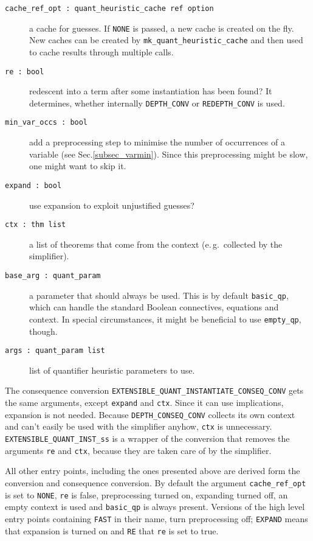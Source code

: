 \documentclass[a4paper,12pt,DIV=12,oneside]{scrbook}
\theoremstyle{definition}
\theoremstyle{remark}
\begin{document}
\begin{description}
  \item[\texttt{cache\_ref\_opt\ :\ quant\_heuristic\_cache ref option}]
     a cache for guesses. If \texttt{NONE} is passed,
     a new cache is created on the fly. New caches can be created by \texttt{mk\_quant\_heuristic\_cache} and then
     used to cache results through multiple calls.
  \item[\texttt{re\ :\ bool}]  redescent into a term after some instantiation has been found?
     It determines, whether internally \texttt{DEPTH\_CONV} or \texttt{REDEPTH\_CONV} is used.

  \item[\texttt{min\_var\_occs\ :\ bool}]  add a preprocessing step to minimise the number of occurrences of
    a variable (see Sec.\ref{subsec_varmin}). Since this preprocessing might be slow, one might want to skip it.

  \item[\texttt{expand\ :\ bool}]  use expansion to exploit unjustified guesses?

  \item[\texttt{ctx\ :\ thm list}]  a list of theorems that come from the context (e.\,g.\ collected by the simplifier).

  \item[\texttt{base\_arg\ :\ quant\_param}]  a parameter that should always be used. This is by default
   \texttt{basic\_qp}, which can handle the standard Boolean connectives, equations and context. In special circumstances,
     it might be beneficial to use \texttt{empty\_qp}, though.

  \item[\texttt{args\ :\ quant\_param list}]  list of quantifier heuristic parameters to use.
\end{description}

The consequence conversion
\texttt{EXTENSIBLE\_QUANT\_INSTANTIATE\_CONSEQ\_CONV} gets the same
arguments, except \texttt{expand} and \texttt{ctx}. Since it can use
implications, expansion is not needed. Because
\texttt{DEPTH\_CONSEQ\_CONV} collects its own context and can't easily
be used with the simplifier anyhow, \texttt{ctx} is unnecessary.
\texttt{EXTENSIBLE\_QUANT\_INST\_ss} is a wrapper of the conversion that removes the arguments
\texttt{re} and \texttt{ctx}, because they are taken care of by the simplifier.

All other entry points, including the ones presented above are derived
form the conversion and consequence conversion. By default the argument
\texttt{cache\_ref\_opt} is set to \texttt{NONE}, \texttt{re} is false,
preprocessing turned on, expanding turned off, an empty context is used and
\texttt{basic\_qp} is always present. Versions of the high level entry points
containing \texttt{FAST} in their name, turn preprocessing off; \texttt{EXPAND} means that
expansion is turned on and \texttt{RE} that \texttt{re} is set to true.
\end{document}
